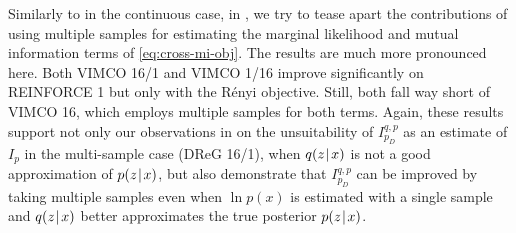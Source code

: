 Similarly to  in the continuous case, in , we try to tease apart the contributions of using multiple samples for estimating the marginal likelihood and mutual information terms of \eqref{eq:cross-mi-obj}.
The results are much more pronounced here.
Both VIMCO 16/1 and VIMCO 1/16 improve significantly on REINFORCE 1 but only with the Rényi objective.
Still, both fall way short of VIMCO 16, which employs multiple samples for both terms.
Again, these results support not only our observations in  on the unsuitability of $I^{q,p}_{p_D}$ as an estimate of $I_p$ in the multi-sample case (DReG 16/1), when $q(z\hspace{0.08em}|\hspace{0.11em} x)$ is not a good approximation of $p(z\hspace{0.08em}|\hspace{0.11em} x)$, but also demonstrate that $I^{q,p}_{p_D}$ can be improved by taking multiple samples even when $\ln p(x)$ is estimated with a single sample and $q(z\hspace{0.08em}|\hspace{0.11em} x)$ better approximates the true posterior $p(z\hspace{0.08em}|\hspace{0.11em} x)$.

